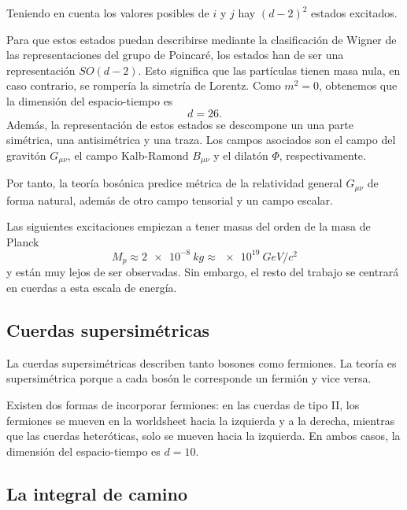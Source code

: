 Teniendo en cuenta los valores posibles de $i$ y $j$ hay $(d-2)^2$ estados excitados.


Para que estos estados puedan describirse mediante la clasificación de Wigner de las
representaciones del grupo de Poincaré, los estados han de ser una representación $SO(d-2)$.
Esto significa que las partículas tienen masa nula, en caso contrario, se rompería la simetría
de Lorentz. Como $m^2=0$, obtenemos que la dimensión del espacio-tiempo es
\begin{equation}
  d=26.
\end{equation}
Además, la representación de estos estados se descompone un una parte simétrica, una antisimétrica
y una traza. Los campos asociados son el campo del gravitón $G_{\mu\nu}$, el campo Kalb-Ramond $B_{\mu\nu}$
y el dilatón $\Phi$, respectivamente.

Por tanto, la teoría bosónica predice métrica de la relatividad general $G_{\mu\nu}$ de forma 
natural, además de otro campo tensorial y un campo escalar.

Las siguientes excitaciones empiezan a tener masas del orden de la masa de Planck
\begin{equation}
  M_p\approx\SI{2e-8}{kg} \approx \SI{e19}{GeV/c^2}
\end{equation}
y están muy lejos de ser observadas. Sin embargo, el resto del trabajo se centrará en cuerdas
a esta escala de energía.


\subsection{Cuerdas supersimétricas}

La cuerdas supersimétricas describen tanto bosones como fermiones.
La teoría es supersimétrica porque a cada bosón le corresponde un fermión y vice versa.

Existen dos formas de incorporar fermiones:
en las cuerdas de tipo II, los fermiones se mueven en la worldsheet hacia la izquierda y a la derecha,
mientras que las cuerdas heteróticas, solo se mueven hacia la izquierda.
En ambos casos, la dimensión del espacio-tiempo es $d=10$.


\subsection{La integral de camino}

